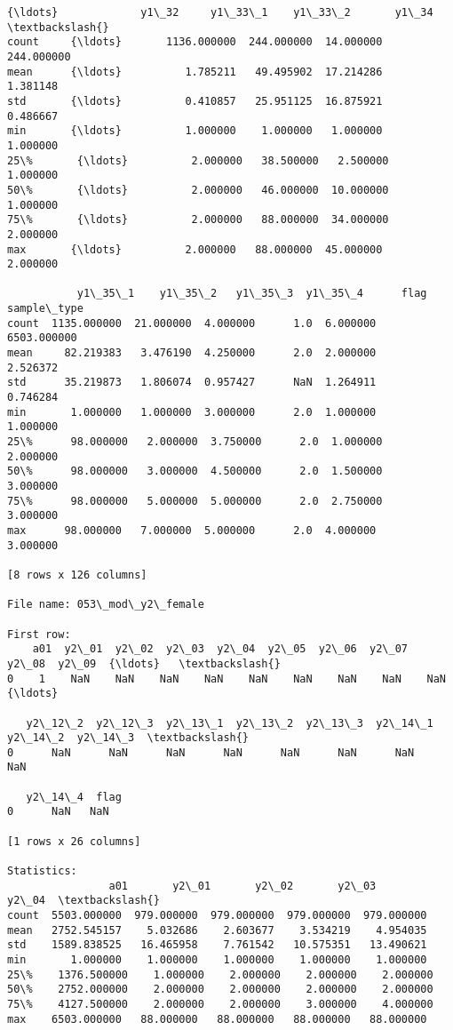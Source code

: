 \documentclass[11pt]{article}
\begin{document}
\begin{Verbatim}[commandchars=\\\{\}]
          {\ldots}             y1\_32     y1\_33\_1    y1\_33\_2       y1\_34  \textbackslash{}
count     {\ldots}       1136.000000  244.000000  14.000000  244.000000   
mean      {\ldots}          1.785211   49.495902  17.214286    1.381148   
std       {\ldots}          0.410857   25.951125  16.875921    0.486667   
min       {\ldots}          1.000000    1.000000   1.000000    1.000000   
25\%       {\ldots}          2.000000   38.500000   2.500000    1.000000   
50\%       {\ldots}          2.000000   46.000000  10.000000    1.000000   
75\%       {\ldots}          2.000000   88.000000  34.000000    2.000000   
max       {\ldots}          2.000000   88.000000  45.000000    2.000000   

           y1\_35\_1    y1\_35\_2   y1\_35\_3  y1\_35\_4      flag  sample\_type  
count  1135.000000  21.000000  4.000000      1.0  6.000000  6503.000000  
mean     82.219383   3.476190  4.250000      2.0  2.000000     2.526372  
std      35.219873   1.806074  0.957427      NaN  1.264911     0.746284  
min       1.000000   1.000000  3.000000      2.0  1.000000     1.000000  
25\%      98.000000   2.000000  3.750000      2.0  1.000000     2.000000  
50\%      98.000000   3.000000  4.500000      2.0  1.500000     3.000000  
75\%      98.000000   5.000000  5.000000      2.0  2.750000     3.000000  
max      98.000000   7.000000  5.000000      2.0  4.000000     3.000000  

[8 rows x 126 columns]

File name: 053\_mod\_y2\_female

First row: 
    a01  y2\_01  y2\_02  y2\_03  y2\_04  y2\_05  y2\_06  y2\_07  y2\_08  y2\_09  {\ldots}   \textbackslash{}
0    1    NaN    NaN    NaN    NaN    NaN    NaN    NaN    NaN    NaN  {\ldots}    

   y2\_12\_2  y2\_12\_3  y2\_13\_1  y2\_13\_2  y2\_13\_3  y2\_14\_1  y2\_14\_2  y2\_14\_3  \textbackslash{}
0      NaN      NaN      NaN      NaN      NaN      NaN      NaN      NaN   

   y2\_14\_4  flag  
0      NaN   NaN  

[1 rows x 26 columns]

Statistics: 
                a01       y2\_01       y2\_02       y2\_03       y2\_04  \textbackslash{}
count  5503.000000  979.000000  979.000000  979.000000  979.000000   
mean   2752.545157    5.032686    2.603677    3.534219    4.954035   
std    1589.838525   16.465958    7.761542   10.575351   13.490621   
min       1.000000    1.000000    1.000000    1.000000    1.000000   
25\%    1376.500000    1.000000    2.000000    2.000000    2.000000   
50\%    2752.000000    2.000000    2.000000    2.000000    2.000000   
75\%    4127.500000    2.000000    2.000000    3.000000    4.000000   
max    6503.000000   88.000000   88.000000   88.000000   88.000000   


\end{Verbatim}
\end{document}
